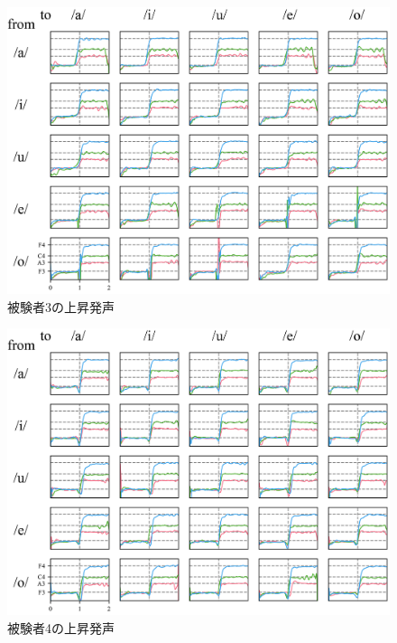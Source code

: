 \documentclass[10.5ptj,a4j,dvipdfmx,uplatex, oneside, openany, report]{jsbook}%
\begin{document}
\begin{figure}[htbp]
    \begin{center}
      \includegraphics[clip,width=12.0cm]{up3.png}
      \caption{被験者3の上昇発声}
      \label{fig:u3}
    \end{center}

\end{figure}\begin{figure}[htbp]
    \begin{center}
      \includegraphics[clip,width=12.0cm]{up4.png}
      \caption{被験者4の上昇発声}
      \label{fig:u4}
    \end{center}
\end{figure}
\end{document}
